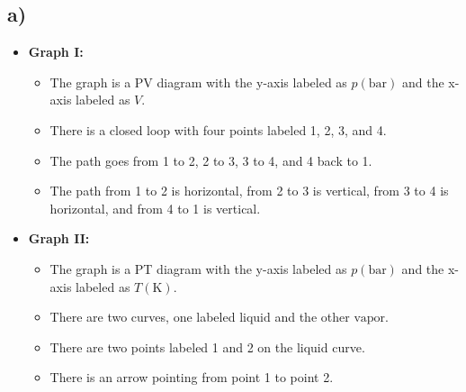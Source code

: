 

\subsection*{a)}

\begin{itemize}
    \item \textbf{Graph I:} 
    \begin{itemize}
        \item The graph is a PV diagram with the y-axis labeled as \( p(\text{bar}) \) and the x-axis labeled as \( V \).
        \item There is a closed loop with four points labeled 1, 2, 3, and 4.
        \item The path goes from 1 to 2, 2 to 3, 3 to 4, and 4 back to 1.
        \item The path from 1 to 2 is horizontal, from 2 to 3 is vertical, from 3 to 4 is horizontal, and from 4 to 1 is vertical.
    \end{itemize}
    
    \item \textbf{Graph II:} 
    \begin{itemize}
        \item The graph is a PT diagram with the y-axis labeled as \( p(\text{bar}) \) and the x-axis labeled as \( T(\text{K}) \).
        \item There are two curves, one labeled \( \text{liquid} \) and the other \( \text{vapor} \).
        \item There are two points labeled 1 and 2 on the liquid curve.
        \item There is an arrow pointing from point 1 to point 2.
    \end{itemize}
\end{itemize}
